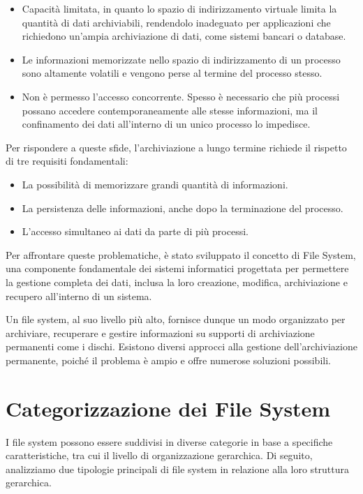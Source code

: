 \documentclass[12pt,a4paper,openright,twoside]{book}
\begin{document}
        \begin{itemize}
            \item Capacità limitata, in quanto lo spazio di indirizzamento virtuale limita la quantità di dati archiviabili, rendendolo inadeguato per applicazioni che richiedono un'ampia archiviazione di dati, come sistemi bancari o database.
            \item Le informazioni memorizzate nello spazio di indirizzamento di un processo sono altamente volatili e vengono perse al termine del processo stesso.
            \item Non è permesso l'accesso concorrente. Spesso è necessario che più processi possano accedere contemporaneamente alle stesse informazioni, ma il confinamento dei dati all'interno di un unico processo lo impedisce.
        \end{itemize}

        Per rispondere a queste sfide, l'archiviazione a lungo termine richiede il rispetto di tre requisiti fondamentali:

        \begin{itemize}
            \item La possibilità di memorizzare grandi quantità di informazioni.
            \item La persistenza delle informazioni, anche dopo la terminazione del processo.
            \item L'accesso simultaneo ai dati da parte di più processi.
        \end{itemize}

        Per affrontare queste problematiche, è stato sviluppato il concetto di File System, una componente fondamentale dei sistemi informatici progettata per permettere la gestione completa dei dati, inclusa la loro creazione, modifica, archiviazione e recupero all'interno di un sistema.

        Un file system, al suo livello più alto, fornisce dunque un modo organizzato per archiviare, recuperare e gestire informazioni su supporti di archiviazione permanenti come i dischi. Esistono diversi approcci alla gestione dell'archiviazione permanente, poiché il problema è ampio e offre numerose soluzioni possibili.

    \section{Categorizzazione dei File System}

        I file system possono essere suddivisi in diverse categorie in base a specifiche caratteristiche, tra cui il livello di organizzazione gerarchica. Di seguito, analizziamo due tipologie principali di file system in relazione alla loro struttura gerarchica.
\end{document}
